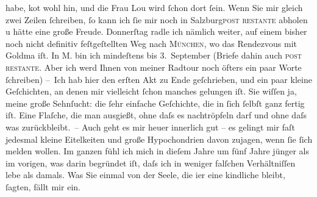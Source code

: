 \begin{ledgroupsized}[t]{13cm}
               habe, ko{\geminationm}t wohl hin, und die Frau Lou wird ſchon dort ſein. Wenn Sie mir gleich zwei Zeilen
               ſchreiben, ſo kann ich ſie mir noch in Salzburg\textsc{post restante} abholen u hätte eine große Freude.
                  Donnerſtag radle ich nämlich weiter, auf einem bisher noch nicht
               definitiv feſtgeſtellten Weg nach \textsc{München}, wo das Rendezvous mit Goldma{\geminationn} iſt. In M. bin ich mindeſtens bis
                  3. September (Briefe dahin auch \textsc{post
                  restante}. Aber ich {\pb}werd Ihnen von meiner Radtour
               noch öfters ein paar Worte ſchreiben)\pend
           \pstart
           – Ich hab hier den erſten Akt
               zu Ende geſchrieben, und ein paar kleine Geſchichten, an denen mir vielleicht ſchon manches gelungen
               iſt. Sie wiſſen ja, meine große Sehnſucht: die ſehr einfache Geſchichte, die in ſich
               ſelbſt ganz fertig iſt. Eine Flaſche, die man ausgießt, ohne daſs es nachtröpfeln
               darf und ohne daſs was zurückbleibt. – Auch geht es mir heuer innerlich gut – es
               gelingt mir faſt jedesmal kleine Eitelkeiten und große {\pb}Hypochondrien davon zujagen, wenn ſie ſich melden wollen. Im ganzen fühl ich mich
               in dieſem Jahre um fünf Jahre jünger als im vorigen, was darin begründet iſt, daſs
               ich in weniger falſchen Verhältniſſen lebe als damals. Was Sie einmal von der Seele,
               die i{\geminationm}er eine kindliche bleibt, ſagten, fällt mir ein.

\end{ledgroupsized}
